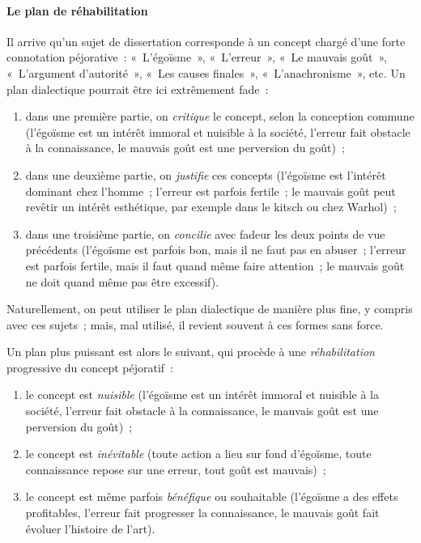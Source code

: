 \documentclass[a4paper,12pt]{article}
\begin{document}
\paragraph{Le plan de réhabilitation}
\label{sec-2-4-2-3}

Il arrive qu'un sujet de dissertation corresponde à un concept chargé
d'une forte connotation péjorative : « L'égoïsme », « L'erreur », « Le
mauvais goût », « L'argument d'autorité », « Les causes finales »,
« L'anachronisme », etc. Un plan dialectique pourrait être ici extrêmement
fade :

\begin{enumerate}
\item dans une première partie, on \emph{critique} le concept, selon la
conception commune (l'égoïsme est un intérêt immoral et nuisible à la
société, l'erreur fait obstacle à la connaissance, le mauvais goût
est une perversion du goût) ;

\item dans une deuxième partie, on \emph{justifie} ces concepts (l'égoïsme est
l'intérêt dominant chez l'homme ; l'erreur est parfois fertile ; le
mauvais goût peut revêtir un intérêt esthétique, par exemple dans le
kitsch ou chez Warhol) ;

\item dans une troisième partie, on \emph{concilie} avec fadeur les deux points
de vue précédents (l'égoïsme est parfois bon, mais il ne faut pas en
abuser ; l'erreur est parfois fertile, mais il faut quand même faire
attention ; le mauvais goût ne doit quand même pas être excessif).
\end{enumerate}

Naturellement, on peut utiliser le plan dialectique de manière plus
fine, y compris avec ces sujets ; mais, mal utilisé, il revient souvent
à ces formes sans force.

Un plan plus puissant est alors le suivant, qui procède à une
\emph{réhabilitation} progressive du concept péjoratif :

\begin{enumerate}
\item le concept est \emph{nuisible} (l'égoïsme est un intérêt immoral et
nuisible à la société, l'erreur fait obstacle à la connaissance, le
mauvais goût est une perversion du goût) ;

\item le concept est \emph{inévitable} (toute action a lieu sur fond d'égoïsme,
toute connaissance repose sur une erreur, tout goût est mauvais) ;

\item le concept est même parfois \emph{bénéfique} ou souhaitable (l'égoïsme a
des effets profitables, l'erreur fait progresser la connaissance, le
mauvais goût fait évoluer l'histoire de l'art).
\end{enumerate}
\end{document}
